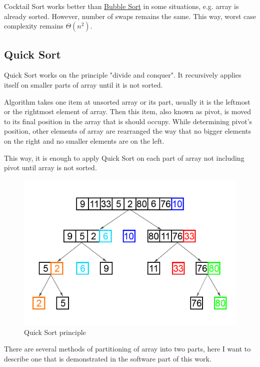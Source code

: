 \documentclass[
  field=inf,
  biblatex,
  language=english,
  glossaries,
  theorems=false,
  sourcecodes=false,
  index
]{kidiplom}
\begin{document}
Cocktail Sort works better than \hyperref[sec:bubble]{Bubble Sort} in some situations, e.g. array is already sorted. However, number of swaps remains the same. This way, worst case complexity remains $\Theta(n^2)$.

\subsection{Quick Sort}

Quick Sort works on the principle "divide and conquer". It recursively applies itself on smaller parts of array until it is not sorted.

Algorithm takes one item at unsorted array or its part, usually it is the leftmost or the rightmost element of array. Then this item, also known as pivot, is moved to its final position in the array that is should occupy. While determining pivot's position, other elements of array are rearranged the way that no bigger elements on the right and no smaller elements are on the left.

This way, it is enough to apply Quick Sort on each part of array not including pivot until array is not sorted.

\begin{figure}[H]
\begin{center}
	
	\includegraphics[scale=0.35]{img/Quicksort.png}
	\caption{Quick Sort principle}\label{fig:insert}
\end{center}
\end{figure}

There are several methods of partitioning of array into two parts, here I want to describe one that is demonstrated in the software part of this work.
\end{document}
